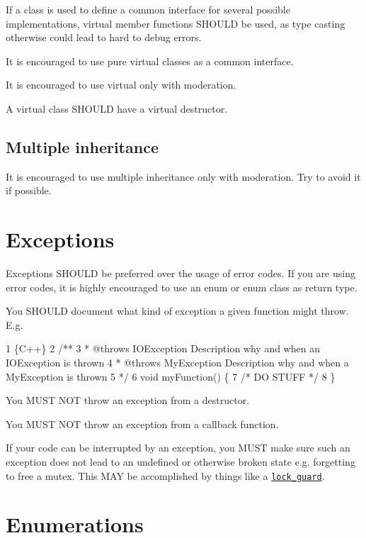 If a class is used to define a common interface for several possible implementations, virtual member functions S\+H\+O\+U\+LD be used, as type casting otherwise could lead to hard to debug errors.

It is encouraged to use pure virtual classes as a common interface.

It is encouraged to use {\ttfamily virtual} only with moderation.

A {\ttfamily virtual} class S\+H\+O\+U\+LD have a {\ttfamily virtual} destructor.

\subsection*{Multiple inheritance}

It is encouraged to use multiple inheritance only with moderation. Try to avoid it if possible.

\section*{Exceptions}

Exceptions S\+H\+O\+U\+LD be preferred over the usage of error codes. If you are using error codes, it is highly encouraged to use an {\ttfamily enum} or {\ttfamily enum class} as return type.

You S\+H\+O\+U\+LD document what kind of exception a given function might throw. E.\+g. 
\begin{DoxyCode}
1 \{C++\}
2 /**
3  * @throws IOException Description why and when an IOException is thrown
4  * @throws MyException Description why and when a MyException is thrown
5  */
6 void myFunction() \{
7     /* DO STUFF */
8 \}
\end{DoxyCode}


You M\+U\+ST N\+OT throw an exception from a destructor.

You M\+U\+ST N\+OT throw an exception from a callback function.

If your code can be interrupted by an exception, you M\+U\+ST make sure such an exception does not lead to an undefined or otherwise broken state e.\+g. forgetting to free a {\ttfamily mutex}. This M\+AY be accomplished by things like a \href{https://en.cppreference.com/w/cpp/thread/lock_guard}{\tt lock\+\_\+guard}.

\section*{Enumerations}

